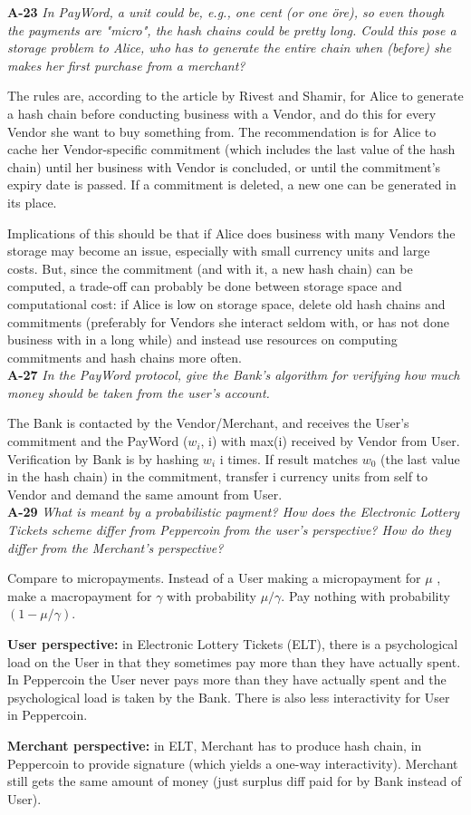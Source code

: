 \documentclass[a4paper]{article}
\newcommand{\Q}[2]{
  \textbf{#1} \textit{#2}
 }
\newcommand{\A}[1]{ #1 \\ }
\begin{document}
\Q{A-23} {In  PayWord,  a  unit  could  be,  e.g.,  one  cent  (or  one  {\"o}re),  
so  even  though  the  payments  are  "micro", the hash chains could be pretty long.  
Could this pose a storage problem to Alice, who has to generate the entire chain when 
(before) she makes her  first purchase from a merchant?}

\A{
  The rules are, according to the article by Rivest and Shamir,
  for Alice to generate a hash chain before conducting business with 
  a Vendor, and do this for every Vendor she want to buy something from.
  The recommendation is for Alice to cache her Vendor-specific commitment 
  (which includes the last value of the hash chain) until her business 
  with Vendor is
  concluded, or until the commitment's expiry date is passed.
  If a commitment is deleted, a new one can be generated in its place.

  Implications of this should be that if Alice does business with many Vendors
  the storage may become an issue, especially with small currency units and large costs.
  But, since the commitment (and with it, a new hash chain) can be computed,
  a trade-off can probably be done between storage space and computational cost:
  if Alice is low on storage space, delete old hash chains and commitments 
  (preferably for Vendors she interact seldom with, or has not done business
  with in a long while) and instead use resources on computing commitments and 
  hash chains more often.
}

\Q{A-27} {In the PayWord protocol, give the Bank's algorithm for verifying how much money 
should be taken from the user's account.}

\A{
  The Bank is contacted by the Vendor/Merchant, and receives the User's 
  commitment and the PayWord ($w_i$, i) with max(i) received by Vendor 
  from User. Verification by Bank is by hashing $w_i$ i times.
  If result matches $w_0$ (the last value in the hash chain) in the 
  commitment, transfer i currency units
  from self to Vendor and demand the same amount from User.
}

\Q{A-29} {What  is  meant  by  a  probabilistic  payment?   How  does  the  
Electronic  Lottery  Tickets  scheme  differ from Peppercoin from the user's perspective?
How do they differ from the Merchant's perspective?}

\A{
  Compare to micropayments. Instead of a User making a micropayment for 
  $\mu$ \textcurrency, make a macropayment for $\gamma$ \textcurrency with 
  probability 
  $\mu / \gamma$. Pay nothing with probability  $(1 - \mu / \gamma)$.

  \textbf{User perspective:} in Electronic Lottery Tickets (ELT),
  there is a psychological load on the User in that they sometimes
  pay more than they have actually spent. In Peppercoin the User
  never pays more than they have actually spent and the psychological
  load is taken by the Bank. There is also less interactivity for 
  User in Peppercoin.

  \textbf{Merchant perspective:} in ELT, Merchant has to produce hash chain, 
  in Peppercoin to provide signature (which yields a one-way interactivity).
  Merchant still gets the same amount of money (just surplus diff
  paid for by Bank instead of User).
}
\end{document}
